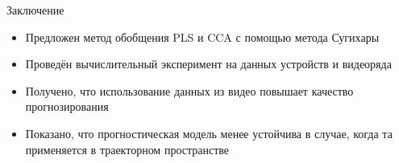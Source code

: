\documentclass{beamer}
\begin{document}
	\begin{frame}{Заключение}
		\begin{itemize}
			\item[\textbullet] Предложен метод обобщения PLS и CCA с помощью метода Сугихары
			
			\item[\textbullet] Проведён вычислительный эксперимент на данных устройств и видеоряда
			
			\item[\textbullet] Получено, что использование данных из видео повышает качество прогнозирования
			
			\item[\textbullet] Показано, что прогностическая модель менее устойчива в случае, когда та применяется в траекторном пространстве
		\end{itemize}
	\end{frame}
\end{document}
